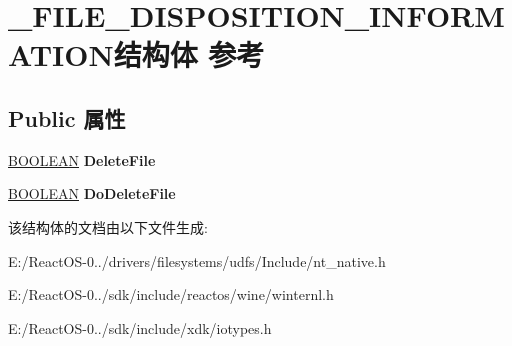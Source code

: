 \hypertarget{struct___f_i_l_e___d_i_s_p_o_s_i_t_i_o_n___i_n_f_o_r_m_a_t_i_o_n}{}\section{\+\_\+\+F\+I\+L\+E\+\_\+\+D\+I\+S\+P\+O\+S\+I\+T\+I\+O\+N\+\_\+\+I\+N\+F\+O\+R\+M\+A\+T\+I\+O\+N结构体 参考}
\label{struct___f_i_l_e___d_i_s_p_o_s_i_t_i_o_n___i_n_f_o_r_m_a_t_i_o_n}
\subsection*{Public 属性}
\begin{DoxyCompactItemize}
\item 
\mbox{\label{struct___f_i_l_e___d_i_s_p_o_s_i_t_i_o_n___i_n_f_o_r_m_a_t_i_o_n_ab5b35dda280a97baf13a3ae08b2079f1}} 
\hyperlink{_processor_bind_8h_a112e3146cb38b6ee95e64d85842e380a}{B\+O\+O\+L\+E\+AN} {\bfseries Delete\+File}
\item 
\mbox{\label{struct___f_i_l_e___d_i_s_p_o_s_i_t_i_o_n___i_n_f_o_r_m_a_t_i_o_n_a58958abff8f5df5e0318a45bb4d44a91}} 
\hyperlink{_processor_bind_8h_a112e3146cb38b6ee95e64d85842e380a}{B\+O\+O\+L\+E\+AN} {\bfseries Do\+Delete\+File}
\end{DoxyCompactItemize}


该结构体的文档由以下文件生成\+:\begin{DoxyCompactItemize}
\item 
E\+:/\+React\+O\+S-\/0../drivers/filesystems/udfs/\+Include/nt\+\_\+native.\+h\item 
E\+:/\+React\+O\+S-\/0../sdk/include/reactos/wine/winternl.\+h\item 
E\+:/\+React\+O\+S-\/0../sdk/include/xdk/iotypes.\+h\end{DoxyCompactItemize}
